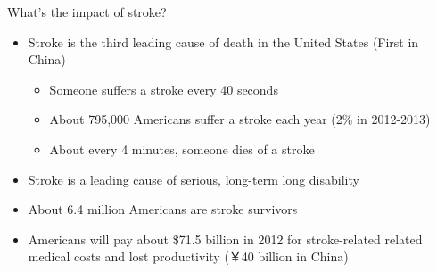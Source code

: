\documentclass[bigger]{beamer}
\begin{document}
\begin{frame}[label={sec:orgheadline2}]{What's the impact of stroke?}
\begin{itemize}
\item Stroke is the third leading cause of death in the United States (First in China)
\begin{itemize}
\item Someone suffers a stroke every 40 seconds
\item About 795,000 Americans suffer a stroke each year (2\% in 2012-2013)
\item About every 4 minutes, someone dies of a stroke
\end{itemize}
\item Stroke is a leading cause of serious, long-term long disability
\item About 6.4 million Americans are stroke survivors
\item Americans will pay about \$71.5 billion in 2012 for stroke-related related medical costs and lost productivity (￥40 billion in China)
\end{itemize}
\end{frame}
\end{document}

